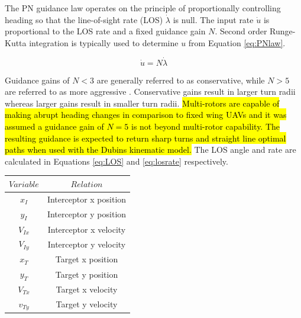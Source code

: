 \documentclass[conference]{IEEEtran}
\begin{document}
The PN guidance law operates on the principle of proportionally controlling heading so that the line-of-sight rate (LOS) $\dot{\lambda}$ is null. The input rate $\dot{u}$ is proportional to the LOS rate and a fixed guidance gain $N$. Second order Runge-Kutta integration is typically used to determine $u$ from Equation \ref{eq:PNlaw}.

\begin{equation} \label{eq:PNlaw}
\dot{u} = N\dot{\lambda}
\end{equation}


Guidance gains of $N < 3$ are generally referred to as conservative, while $N > 5$ are referred to as more aggressive \cite{zarchan}. Conservative gains result in larger turn radii whereas larger gains result in smaller turn radii. \hl{Multi-rotors are capable of making abrupt heading changes in comparison to fixed wing UAVs and it was assumed a guidance gain of $N = 5$ is not beyond multi-rotor capability. The resulting guidance is expected to return sharp turns and straight line optimal paths when used with the Dubins kinematic model.} The LOS angle and rate are calculated in Equations \ref{eq:LOS} and \ref{eq:losrate} respectively. 
 
 \begin{table}
 \centering
 \begin{tabular}{cc}
 	
 	$Variable$ & $Relation$ \\
 	\hline 
 	$x_I$  & Interceptor x position \\ 
 	
 	$y_I$ & Interceptor y position \\ 
 	
 	$V_{Ix}$ & Interceptor x velocity \\ 
 	
 	$V_{Iy}$ & Interceptor y velocity \\ 
 	
 	$x_T$ & Target x position \\ 
 	
 	$y_T$ & Target y position \\ 
 	
 	$V_{Tx}$ & Target x velocity \\ 
 	
 	$v_{Ty}$ & Target y velocity \\ 
 	
 \end{tabular}
 \end{table}
\end{document}

